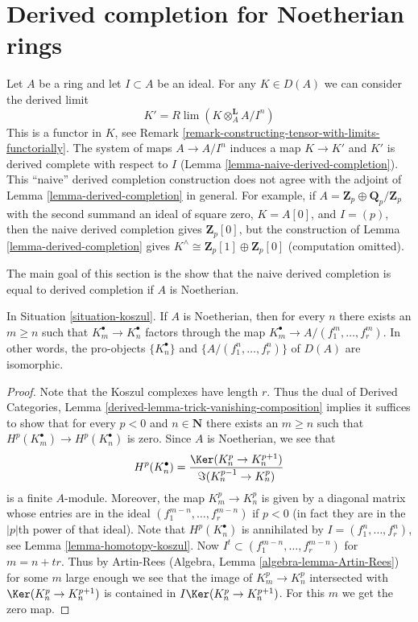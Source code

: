\section{Derived completion for Noetherian rings}
\label{section-derived-completion-noetherian}

\noindent
Let $A$ be a ring and let $I \subset A$ be an ideal. For any
$K \in D(A)$ we can consider the derived limit
$$
K' = R\lim (K \otimes_A^\mathbf{L} A/I^n)
$$
This is a functor in $K$, see
Remark \ref{remark-constructing-tensor-with-limits-functorially}.
The system of maps $A \to A/I^n$ induces a map $K \to K'$
and $K'$ is derived complete with respect to $I$
(Lemma \ref{lemma-naive-derived-completion}).
This ``naive'' derived completion construction does not agree
with the adjoint of Lemma \ref{lemma-derived-completion} in general.
For example, if $A = \mathbf{Z}_p \oplus \mathbf{Q}_p/\mathbf{Z}_p$
with the second summand an ideal of square zero, $K = A[0]$, and $I = (p)$,
then the naive derived completion gives $\mathbf{Z}_p[0]$, but the
construction of Lemma \ref{lemma-derived-completion} gives
$K^\wedge \cong \mathbf{Z}_p[1] \oplus \mathbf{Z}_p[0]$ (computation omitted).

\medskip\noindent
The main goal of this section is the show that the naive
derived completion is equal to derived completion if $A$
is Noetherian.

\begin{lemma}
\label{lemma-sequence-Koszul-complexes}
In Situation \ref{situation-koszul}.
If $A$ is Noetherian, then for every $n$
there exists an $m \geq n$ such that $K_m^\bullet \to K_n^\bullet$
factors through the map $K_m^\bullet \to A/(f_1^m, \ldots, f_r^m)$.
In other words, the pro-objects $\{K_n^\bullet\}$ and
$\{A/(f_1^n, \ldots, f_r^n)\}$ of $D(A)$ are isomorphic.
\end{lemma}

\begin{proof}
Note that the Koszul complexes have length $r$. Thus the dual of
Derived Categories, Lemma \ref{derived-lemma-trick-vanishing-composition}
implies it suffices to show that for every $p < 0$ and $n \in \mathbf{N}$
there exists an $m \geq n$ such that $H^p(K_m^\bullet) \to H^p(K_n^\bullet)$
is zero. Since $A$ is Noetherian, we see that
$$
H^p(K_n^\bullet) =
\frac{\Ker(K_n^p \to K_n^{p + 1})}{\Im(K_n^{p - 1} \to K_n^p)}
$$
is a finite $A$-module. Moreover, the map $K_m^p \to K_n^p$ is given
by a diagonal matrix whose entries are in the ideal
$(f_1^{m - n}, \ldots, f_r^{m - n})$ if $p < 0$ (in fact they are in the
$|p|$th power of that ideal). Note that $H^p(K_n^\bullet)$ is annihilated by
$I = (f_1^n, \ldots, f_r^n)$, see Lemma \ref{lemma-homotopy-koszul}. Now
$I^t \subset (f_1^{m - n}, \ldots, f_r^{m - n})$ for $m = n + tr$.
Thus by Artin-Rees (Algebra, Lemma \ref{algebra-lemma-Artin-Rees})
for some $m$ large enough we see that
the image of $K_m^p \to K_n^p$ intersected with
$\Ker(K_n^p \to K_n^{p + 1})$ is contained in
$I \Ker(K_n^p \to K_n^{p + 1})$. For this $m$ we get the zero map.
\end{proof}

